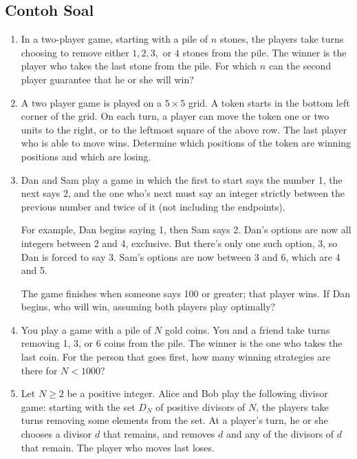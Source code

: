 \documentclass[12pt]{scrartcl}
\begin{document}
\subsection{Contoh Soal}
\begin{enumerate}
    \item In a two-player game, starting with a pile of $ n $ stones, the players take turns choosing to remove either $ 1,2,3, $ or $ 4 $ stones from the pile. The winner is the player who takes the last stone from the pile. For which $ n $ can the second player guarantee that he or she will win?

    \item A two player game is played on a $5 \times 5$ grid. A token starts in the bottom left corner of the grid. On each turn, a player can move the token one or two units to the right, or to the leftmost square of the above row. The last player who is able to move wins. Determine which positions of the token are winning positions and which are losing.

    \item Dan and Sam play a game in which the first to start says the number 1, the next says 2, and the one who's next must say an integer strictly between the previous number and twice of it (not including the endpoints).
    
    For example, Dan begins saying 1, then Sam says 2. Dan's options are now all integers between 2 and 4, exclusive. But there's only one such option, 3, so Dan is forced to say 3. Sam's options are now between 3 and 6, which are 4 and 5.
    
    The game finishes when someone says 100 or greater; that player wins. If Dan begins, who will win, assuming both players play optimally?


    \item You play a game with a pile of $N$ gold coins. You and a friend take turns removing 1, 3, or 6 coins from the pile. The winner is the one who takes the last coin. For the person that goes first, how many winning strategies are there for $N < 1000?$

    \item Let $ N \ge 2 $ be a positive integer. Alice and Bob play the following divisor game: starting with the set $ D_N $ of positive divisors of $ N$, the players take turns removing some elements from the set. At a player's turn, he or she chooses a divisor $ d $ that remains, and removes $ d $ and any of the divisors of $ d $ that remain. The player who moves last loses.
    

\end{enumerate}
\end{document}
